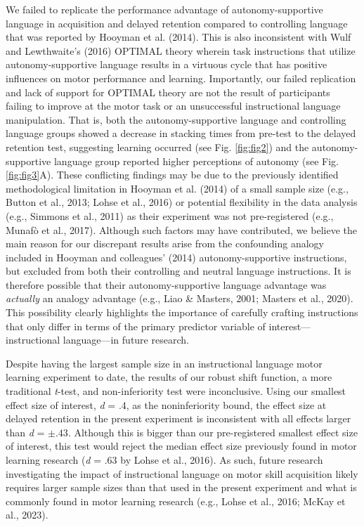 \documentclass[
  man, donotrepeattitle,mask,floatsintext]{apa7}
\begin{document}
We failed to replicate the performance advantage of autonomy-supportive language in acquisition and delayed retention compared to controlling language that was reported by Hooyman et al. (2014). This is also inconsistent with Wulf and Lewthwaite's (2016) OPTIMAL theory wherein task instructions that utilize autonomy-supportive language results in a virtuous cycle that has positive influences on motor performance and learning. Importantly, our failed replication and lack of support for OPTIMAL theory are not the result of participants failing to improve at the motor task or an unsuccessful instructional language manipulation. That is, both the autonomy-supportive language and controlling language groups showed a decrease in stacking times from pre-test to the delayed retention test, suggesting learning occurred (see Fig. \ref{fig:fig2}) and the autonomy-supportive language group reported higher perceptions of autonomy (see Fig. \ref{fig:fig3}A). These conflicting findings may be due to the previously identified methodological limitation in Hooyman et al. (2014) of a small sample size (e.g., Button et al., 2013; Lohse et al., 2016) or potential flexibility in the data analysis (e.g., Simmons et al., 2011) as their experiment was not pre-registered (e.g., Munafò et al., 2017). Although such factors may have contributed, we believe the main reason for our discrepant results arise from the confounding analogy included in Hooyman and colleagues' (2014) autonomy-supportive instructions, but excluded from both their controlling and neutral language instructions. It is therefore possible that their autonomy-supportive language advantage was \emph{actually} an analogy advantage (e.g., Liao \& Masters, 2001; Masters et al., 2020). This possibility clearly highlights the importance of carefully crafting instructions that only differ in terms of the primary predictor variable of interest---instructional language---in future research.

Despite having the largest sample size in an instructional language motor learning experiment to date, the results of our robust shift function, a more traditional \emph{t}-test, and non-inferiority test were inconclusive. Using our smallest effect size of interest, \emph{d} = .4, as the noninferiority bound, the effect size at delayed retention in the present experiment is inconsistent with all effects larger than \emph{d} = \(\pm .43\). Although this is bigger than our pre-registered smallest effect size of interest, this test would reject the median effect size previously found in motor learning research (\emph{d} = .63 by Lohse et al., 2016). As such, future research investigating the impact of instructional language on motor skill acquisition likely requires larger sample sizes than that used in the present experiment and what is commonly found in motor learning research (e.g., Lohse et al., 2016; McKay et al., 2023).
\end{document}
